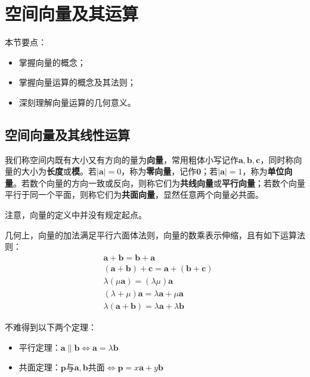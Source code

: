 \section{空间向量及其运算}

本节要点：
\begin{itemize}
    \item 掌握向量的概念；
    \item 掌握向量运算的概念及其法则；
    \item 深刻理解向量运算的几何意义。
\end{itemize}

\subsection{空间向量及其线性运算}

\begin{definition}
我们称空间内既有大小又有方向的量为{\bf 向量}，常用粗体小写记作$\boldsymbol{a},\boldsymbol{b},\boldsymbol{c}$，同时称向量的大小为{\bf 长度}或{\bf 模}。若$\left| \boldsymbol{a} \right|=0$，称为{\bf 零向量}，记作$\mathbf{0}$；若$\left| \boldsymbol{a} \right|=1$，称为{\bf 单位向量}。若数个向量的方向一致或反向，则称它们为{\bf 共线向量}或{\bf 平行向量}；若数个向量平行于同一个平面，则称它们为{\bf 共面向量}，显然任意两个向量必共面。
\end{definition}

\begin{tcolorbox}
注意，向量的定义中并没有规定起点。
\end{tcolorbox}

几何上，向量的加法满足平行六面体法则，向量的数乘表示伸缩，且有如下运算法则：
\begin{align*}
&\boldsymbol{a}+\boldsymbol{b}=\boldsymbol{b}+\boldsymbol{a} \\
&\left( \boldsymbol{a}+\boldsymbol{b} \right) +\boldsymbol{c}=\boldsymbol{a}+\left( \boldsymbol{b}+\boldsymbol{c} \right) \\
&\lambda \left( \mu \boldsymbol{a} \right) =\left( \lambda \mu \right) \boldsymbol{a} \\
&\left( \lambda +\mu \right) \boldsymbol{a}=\lambda \boldsymbol{a}+\mu \boldsymbol{a} \\
&\lambda \left( \boldsymbol{a}+\boldsymbol{b} \right) =\lambda \boldsymbol{a}+\lambda \boldsymbol{b}
\end{align*}

\begin{theorem}
不难得到以下两个定理：
\begin{itemize}
    \item 平行定理：$\boldsymbol{a}\parallel \boldsymbol{b}\Leftrightarrow \boldsymbol{a}=\lambda \boldsymbol{b}$
    \item 共面定理：$\boldsymbol{p}\text{与}\boldsymbol{a},\boldsymbol{b}\text{共面}\Leftrightarrow \boldsymbol{p}=x\boldsymbol{a}+y\boldsymbol{b}$
\end{itemize}
\end{theorem}

